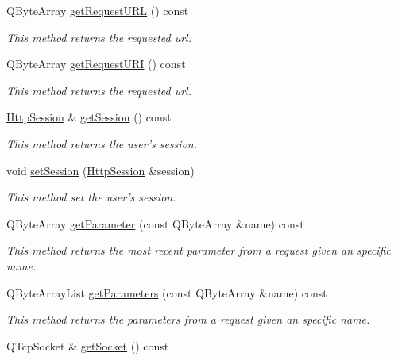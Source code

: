 \begin{DoxyCompactItemize}
Q\+Byte\+Array \hyperlink{class_c_w_f_1_1_http_servlet_request_a9408f2866aa0fc49242e74b85a514869}{get\+Request\+U\+R\+L} () const 
\begin{DoxyCompactList}\small\item\em This method returns the requested url. \end{DoxyCompactList}\item 
Q\+Byte\+Array \hyperlink{class_c_w_f_1_1_http_servlet_request_ade6b21cdd789a5892e472915ede386fd}{get\+Request\+U\+R\+I} () const 
\begin{DoxyCompactList}\small\item\em This method returns the requested url. \end{DoxyCompactList}\item 
\hyperlink{class_c_w_f_1_1_http_session}{Http\+Session} \& \hyperlink{class_c_w_f_1_1_http_servlet_request_aad0cadb7d24101705a6f83b82eb7c025}{get\+Session} () const 
\begin{DoxyCompactList}\small\item\em This method returns the user's session. \end{DoxyCompactList}\item 
void \hyperlink{class_c_w_f_1_1_http_servlet_request_a2a613871d53495a3bacb61d68a424708}{set\+Session} (\hyperlink{class_c_w_f_1_1_http_session}{Http\+Session} \&session)
\begin{DoxyCompactList}\small\item\em This method set the user's session. \end{DoxyCompactList}\item 
Q\+Byte\+Array \hyperlink{class_c_w_f_1_1_http_servlet_request_a09c2b6f6241263a2626686e80ab6e126}{get\+Parameter} (const Q\+Byte\+Array \&name) const 
\begin{DoxyCompactList}\small\item\em This method returns the most recent parameter from a request given an specific name. \end{DoxyCompactList}\item 
Q\+Byte\+Array\+List \hyperlink{class_c_w_f_1_1_http_servlet_request_afc56e6e1a1d76c727924de6847c4ef27}{get\+Parameters} (const Q\+Byte\+Array \&name) const 
\begin{DoxyCompactList}\small\item\em This method returns the parameters from a request given an specific name. \end{DoxyCompactList}\item 
Q\+Tcp\+Socket \& \hyperlink{class_c_w_f_1_1_http_servlet_request_ad6496a8dcda50dd7ec9f389b4cbb4349}{get\+Socket} () const 

\end{DoxyCompactItemize}
